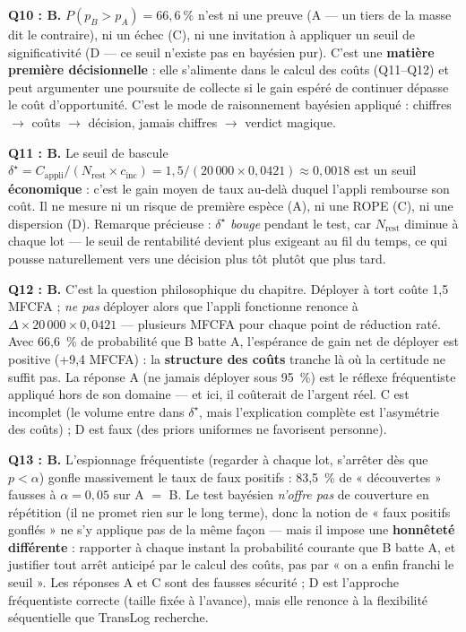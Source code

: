 \documentclass[11pt,a4paper]{article}
\begin{document}
\begin{corrigebox}
\textbf{Q10 : B.} $P(p_B > p_A) = 66{,}6~\%$ n'est ni une preuve (A --- un
tiers de la masse dit le contraire), ni un échec (C), ni une invitation à
appliquer un seuil de significativité (D --- ce seuil n'existe pas en
bayésien pur). C'est une \textbf{matière première décisionnelle} : elle
s'alimente dans le calcul des coûts (Q11--Q12) et peut argumenter une
poursuite de collecte si le gain espéré de continuer dépasse le coût
d'opportunité. C'est le mode de raisonnement bayésien appliqué : chiffres
$\to$ coûts $\to$ décision, jamais chiffres $\to$ verdict magique.

\textbf{Q11 : B.} Le seuil de bascule $\delta^{\star} = C_{\text{appli}} /
(N_{\text{rest}} \times c_{\text{inc}}) = 1{,}5 / (20\,000 \times 0{,}0421)
\approx 0{,}0018$ est un seuil \textbf{économique} : c'est le gain moyen de
taux au-delà duquel l'appli rembourse son coût. Il ne mesure ni un risque de
première espèce (A), ni une ROPE (C), ni une dispersion (D). Remarque
précieuse : $\delta^{\star}$ \emph{bouge} pendant le test, car
$N_{\text{rest}}$ diminue à chaque lot --- le seuil de rentabilité devient
plus exigeant au fil du temps, ce qui pousse naturellement vers une décision
plus tôt plutôt que plus tard.

\textbf{Q12 : B.} C'est la question philosophique du chapitre. Déployer à
tort coûte 1,5 MFCFA ; \emph{ne pas} déployer alors que l'appli fonctionne
renonce à $\Delta \times 20\,000 \times 0{,}0421$ --- plusieurs MFCFA pour
chaque point de réduction raté. Avec 66,6~\% de probabilité que B batte A,
l'espérance de gain net de déployer est positive (+9,4 MFCFA) : la
\textbf{structure des coûts} tranche là où la certitude ne suffit pas. La
réponse A (ne jamais déployer sous 95~\%) est le réflexe fréquentiste appliqué
hors de son domaine --- et ici, il coûterait de l'argent réel. C est
incomplet (le volume entre dans $\delta^\star$, mais l'explication complète
est l'asymétrie des coûts) ; D est faux (des priors uniformes ne favorisent
personne).

\textbf{Q13 : B.} L'espionnage fréquentiste (regarder à chaque lot, s'arrêter
dès que $p < \alpha$) gonfle massivement le taux de faux positifs : 83,5~\%
de « découvertes » fausses à $\alpha = 0{,}05$ sur A $=$ B. Le test bayésien
\emph{n'offre pas} de couverture en répétition (il ne promet rien sur le
long terme), donc la notion de « faux positifs gonflés » ne s'y applique pas
de la même façon --- mais il impose une \textbf{honnêteté différente} :
rapporter à chaque instant la probabilité courante que B batte A, et
justifier tout arrêt anticipé par le calcul des coûts, pas par « on a enfin
franchi le seuil ». Les réponses A et C sont des fausses sécurité ; D est
l'approche fréquentiste correcte (taille fixée à l'avance), mais elle renonce
à la flexibilité séquentielle que TransLog recherche.
\end{corrigebox}
\end{document}
